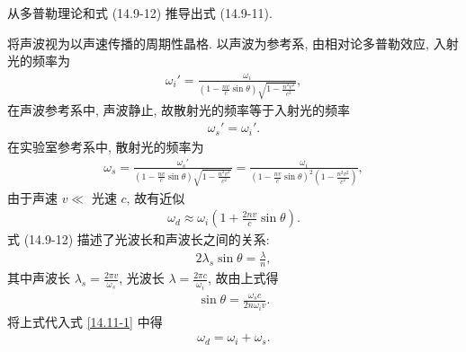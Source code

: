 \documentclass[twoside]{note}
\begin{document}
\begin{exe}
    从多普勒理论和式 (14.9-12) 推导出式 (14.9-11).
\end{exe}
\begin{pf}
    将声波视为以声速传播的周期性晶格.
    以声波为参考系, 由相对论多普勒效应, 入射光的频率为
    \begin{align}
        \omega_i'=\frac{\omega_i}{\left(1-\frac{nv}{c}\sin\theta\right)\sqrt{1-\frac{n^2v^2}{c^2}}},
    \end{align}
    在声波参考系中, 声波静止, 故散射光的频率等于入射光的频率
    \begin{align}
        \omega_s'=\omega_i'.
    \end{align}
    在实验室参考系中, 散射光的频率为
    \begin{align}
        \omega_s=\frac{\omega_s'}{\left(1-\frac{nv}{c}\sin\theta\right)\sqrt{1-\frac{n^2v^2}{c^2}}}=\frac{\omega_i}{\left(1-\frac{nv}{c}\sin\theta\right)^2\left(1-\frac{n^2v^2}{c^2}\right)},
    \end{align}
    由于声速 $v\ll$ 光速 $c$, 故有近似
    \begin{align}
        \label{14.11-1}
        \omega_d\approx\omega_i\left(1+\frac{2nv}{c}\sin\theta\right).
    \end{align}
    式 (14.9-12) 描述了光波长和声波长之间的关系:
    \begin{align}
        2\lambda_s\sin\theta=\frac{\lambda}{n},
    \end{align}
    其中声波长 $\lambda_s=\frac{2\pi v}{\omega_s}$, 光波长 $\lambda=\frac{2\pi c}{\omega_i}$, 故由上式得
    \begin{align}
        \sin\theta=\frac{\omega_sc}{2n\omega_iv}.
    \end{align}
    将上式代入式 \eqref{14.11-1} 中得
    \begin{align}
        \omega_d=\omega_i+\omega_s.
    \end{align}
\end{pf}
\ifx\allfiles\undefined
\end{document}
